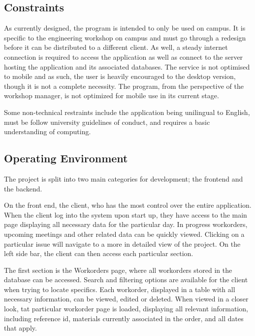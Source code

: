 {\subsection{Constraints}
As currently designed, the program is intended to only be used on campus. It is specific to the engineering workshop on campus and must go through a redesign before it can be distributed to a different client. As well, a steady internet connection is required to access the application as well as connect to the server hosting the application and its associated databases. The service is not optimised to mobile and as such, the user is heavily encouraged to the desktop version, though it is not a complete necessity. The program, from the perspective of the workshop manager, is not optimized for mobile use in its current stage.
\newline
{\setlength{\parindent}{0cm}

Some non-technical restraints include the application being unilingual to English, must be follow university guidelines of conduct, and requires a basic understanding of computing.  

\subsection{Operating Environment}
 The project is split into two main categories for development; the frontend and the backend. 
\newline
{\setlength{\parindent}{0cm}

On the front end, the client, who has the most control over the entire application. When the client log into the system upon start up, they have access to the main page displaying all necessary data for the particular day. In progress workorders, upcoming meetings and other related data can be quickly viewed. Clicking on a particular issue will navigate to a more in detailed view of the project. On the left side bar, the client can then access each particular section. 
\newline
{\setlength{\parindent}{0cm}

The first section is the Workorders page, where all workorders stored in the database can be accessed. Search and filtering options are available for the client when trying to locate specifics. Each workorder, displayed in a table with all necessary information, can be viewed, edited or deleted. When viewed in a closer look, tat particular workorder page is loaded, displaying all relevant information, including reference id, materials currently associated in the order, and all dates that apply. 
\newline
{\setlength{\parindent}{0cm}

}}}}}
